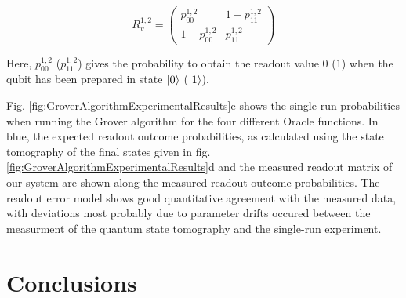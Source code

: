 \begin{equation}
R_{v}^{1,2} = \left(
			\begin{array}{cc}
				p_{00}^{1,2} & 1-p_{11}^{1,2} \\
				1-p_{00}^{1,2} & p_{11}^{1,2}
			\end{array}
		\right)
\end{equation}

Here, $p_{00}^{1,2}$ ($p_{11}^{1,2}$) gives the probability to obtain the readout value $0$ ($1$) when the qubit has been prepared in state $\left| 0 \right>$ ($\left| 1 \right>$).

\smallskip

Fig. \ref{fig:GroverAlgorithmExperimentalResults}e shows the single-run probabilities when running the Grover algorithm for the four different Oracle functions. In blue, the expected readout outcome probabilities, as calculated using the state tomography of the final states given in fig. \ref{fig:GroverAlgorithmExperimentalResults}d and the measured readout matrix of our system are shown along the measured readout outcome probabilities. The readout error model shows good quantitative agreement with the measured data, with deviations most probably due to parameter drifts occured between the measurment of the quantum state tomography and the single-run experiment.

\section{Conclusions}

